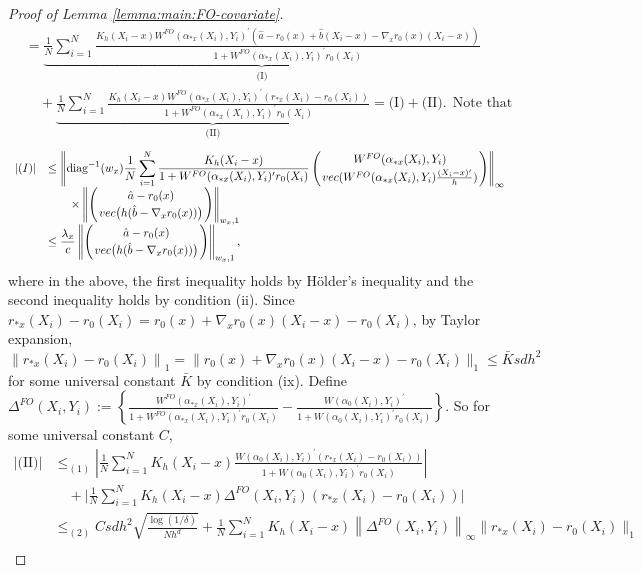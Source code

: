 \documentclass[10pt,a4paper]{amsart}
\begin{document}
\begin{proof}[Proof of Lemma \ref{lemma:main:FO-covariate}]
$$\begin{array}{rl}
&\displaystyle = \underbrace{\frac{1}{N}\sum_{i=1}^N\frac{K_h(X_i-x)W^{FO}(\alpha_{*x}(X_i),Y_i)^\prime( \hat a - r_0(x) + \hat b(X_i-x) - \nabla_x r_0(x)(X_i-x))}{1+W^{FO}(\alpha_{*x}(X_i),Y_i)^\prime r_0(X_i)}}_{\textrm{(I)}} \\
&\displaystyle\quad + \underbrace{\frac{1}{N}\sum_{i=1}^N\frac{K_h(X_i-x)W^{FO}(\alpha_{*x}(X_i),Y_i)^\prime(r_{*x}(X_i)-r_0(X_i))}{1+W^{FO}(\alpha_{*x}(X_i),Y_i)^\prime r_0(X_i)}}_{\textrm{(II)}} = \textrm{(I)} + \textrm{(II)}.\ \ \mbox{Note that}
\end{array}$$
$$\begin{array}{rl}
|\textrm{(I)}|
&\displaystyle\leq\left\|\mathrm{diag}^{-1}(w_x)\frac{1}{N}\sum_{i=1}^N\frac{  K_h(X_i-x) }{1+W^{FO}(\alpha_{*x}(X_i),Y_i)^\prime r_0(X_i)} \left( { W^{FO}(\alpha_{*x}(X_i),Y_i)}\atop{ {\rm vec}(W^{FO}(\alpha_{*x}(X_i),Y_i)\frac{(X_i-x)'}{h} )}\right)\right\|_\infty\\
&\displaystyle\quad\quad\times\left\|\left( {\hat a - r_0(x)}\atop{ {\rm vec}\big(h(\hat b - \nabla_xr_0(x)})\big)\right) \right\|_{w_x,1}\\
&\displaystyle\leq\frac{\lambda_x}{c}\left\|\left( {\hat a - r_0(x)}\atop{ {\rm vec}\big(h(\hat b - \nabla_xr_0(x)})\big)\right) \right\|_{w_x,1},
\end{array}$$
where in the above, the first inequality holds by H\"older's inequality and the second inequality holds by condition (ii). Since $r_{*x}(X_i)-r_0(X_i)=r_0(x)+\nabla_x r_0(x)(X_i-x) - r_0(X_i)$, by Taylor expansion, $\left\|  r_{*x}(X_i)-r_0(X_i) \right\|_1=\| r_0(x)+\nabla_x r_0(x)(X_i-x) - r_0(X_i) \|_1\leq\bar{K}sdh^2$ for some universal constant $\bar{K}$ by condition (ix). Define $\Delta^{FO}(X_i,Y_i):=\left\{\frac{W^{FO}(\alpha_{*x}(X_i),Y_i)^\prime}{1+W^{FO}(\alpha_{*x}(X_i),Y_i)^\prime r_0(X_i)}-\frac{W(\alpha_0(X_i),Y_i)^\prime}{1+W(\alpha_0(X_i),Y_i)^\prime r_0(X_i)}\right\}$.
So for some universal constant $C$,
$$\begin{array}{rl}
|\textrm{(II)}|&\displaystyle \leq_{(1)} \left|\frac{1}{N}\sum_{i=1}^N K_h(X_i-x)\frac{ W(\alpha_0(X_i),Y_i)^\prime(r_{*x}(X_i)-r_0(X_i))}{1+W(\alpha_0(X_i),Y_i)^\prime r_0(X_i)}\right|\\
&\displaystyle\quad+\bigg|\frac{1}{N}\sum_{i=1}^N K_h(X_i-x)\Delta^{FO}(X_i,Y_i)(r_{*x}(X_i)-r_0(X_i)) \bigg|\\
&\displaystyle\leq_{(2)} Csdh^2\sqrt{\frac{\log(1/\delta)}{Nh^d}}+ \frac{1}{N}{\displaystyle\sum_{i=1}^N} K_h(X_i-x)\left\|\Delta^{FO}(X_i,Y_i)\right\|_\infty\|r_{*x}(X_i)-r_0(X_i)\|_1 \\

\end{array}$$
\end{proof}
\end{document}
